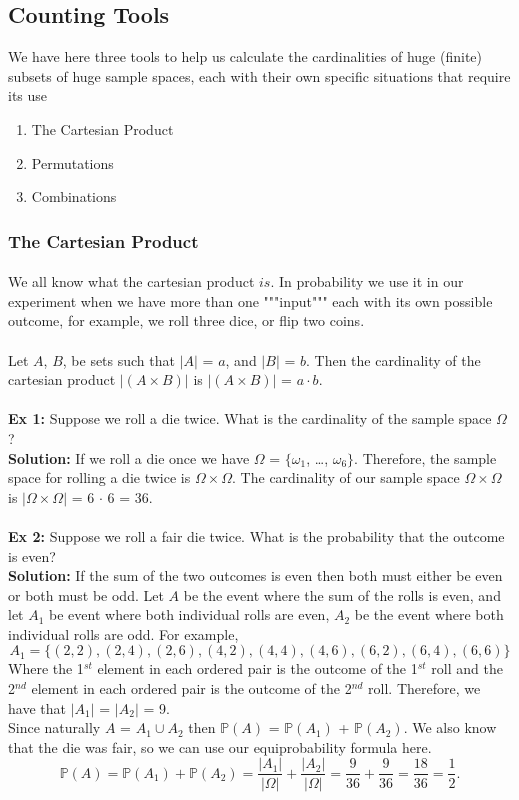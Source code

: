 \documentclass{article}
\newcommand{\bbP}{\mathbb{P}}
\newcommand{\Om}{\Omega}
\begin{document}
\subsection{Counting Tools}
We have here three tools to help us calculate the cardinalities of huge (finite) subsets of huge sample spaces, each with their own specific situations that require its use
\begin{enumerate}
	\item The Cartesian Product
	\item Permutations
	\item Combinations
\end{enumerate}
\subsubsection{The Cartesian Product}
\paragraph{}
We all know what the cartesian product $is$. In probability we use it in our experiment when we have more than one """input""" each with its own possible outcome, for example, we roll three dice, or flip two coins.
\paragraph{}
Let $A$, $B$, be sets such that $|A|$ = $a$, and $|B|$ = $b$. Then the cardinality of the cartesian product $|(A \times B)|$ is $|(A \times B)|$ = $a \cdot b$.\\\\
\textbf{Ex 1:} Suppose we roll a die twice. What is the cardinality of the sample space $\Om$?\\
\textbf{Solution:} If we roll a die once we have $\Om$ = $\{$$\omega_{1}$, \dots, $\omega_{6}$$\}$. Therefore, the sample space for rolling a die twice is $\Om \times \Om$. The cardinality of our sample space $\Om \times \Om$ is $|\Om \times \Om|$ = 6 $\cdot$ 6 = 36.\\\\
\textbf{Ex 2:} Suppose we roll a fair die twice. What is the probability that the outcome is even?\\
\textbf{Solution:} If the sum of the two outcomes is even then both must either be even or both must be odd. Let $A$ be the event where the sum of the rolls is even, and let $A_{1}$ be event where both individual rolls are even, $A_{2}$ be the event where both individual rolls are odd. For example,
\[A_{1} = \{(2, 2), (2, 4), (2, 6), (4, 2), (4, 4), (4, 6), (6, 2), (6, 4), (6, 6)\}\] 
Where the 1$^{st}$ element in each ordered pair is the outcome of the 1$^{st}$ roll and the 2$^{nd}$ element in each ordered pair is the outcome of the 2$^{nd}$ roll. Therefore, we have that $|A_{1}|$ = $|A_{2}|$ = 9.\\ 
Since naturally $A$ = $A_{1} \cup A_{2}$ then $\bbP(A)$ = $\bbP(A_{1})$ + $\bbP(A_{2})$. We also know that the die was fair, so we can use our equiprobability formula here.
\[ \bbP(A) = \bbP(A_{1}) + \bbP(A_{2}) = \frac{|A_{1}|}{|\Om|} + \frac{|A_{2}|}{|\Om|} = \frac{9}{36} + \frac{9}{36} = \frac {18}{36} = \frac{1}{2}.\]
\end{document}
